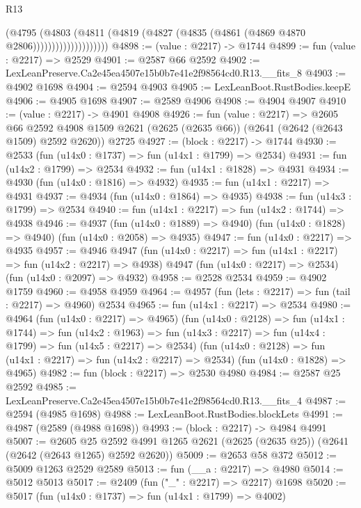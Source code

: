 \begin{lexlean}{R13}
\begin{coremodule}
                            (@4795
                              (@4803
                                (@4811
                                  (@4819 (@4827 (@4835 (@4861 (@4869 @4870 @2806))))))))))))))))))))
@4898 := (value : @2217) -> @1744
@4899 := fun (value : @2217) => @2529
@4901 := @2587 @66 @2592
@4902 := LexLeanPreserve.Ca2e45ea4507e15b0b7e41e2f98564cd0.R13.__fits_8
@4903 := @4902 @1698
@4904 := @2594 @4903
@4905 := LexLeanBoot.RustBodies.keepE
@4906 := @4905 @1698
@4907 := @2589 @4906
@4908 := @4904 @4907
@4910 := (value : @2217) -> @4901 @4908
@4926 := fun (value : @2217) =>
  @2605
    @66
    @2592
    @4908
    @1509
    @2621
    (@2625 (@2635 @66))
    (@2641 (@2642 (@2643 @1509) @2592 @2620))
    @2725
@4927 := (block : @2217) -> @1744
@4930 := @2533 (fun (u14x0 : @1737) => fun (u14x1 : @1799) => @2534)
@4931 := fun (u14x2 : @1799) => @2534
@4932 := fun (u14x1 : @1828) => @4931
@4934 := @4930 (fun (u14x0 : @1816) => @4932)
@4935 := fun (u14x1 : @2217) => @4931
@4937 := @4934 (fun (u14x0 : @1864) => @4935)
@4938 := fun (u14x3 : @1799) => @2534
@4940 := fun (u14x1 : @2217) => fun (u14x2 : @1744) => @4938
@4946 := @4937
    (fun (u14x0 : @1889) => @4940)
    (fun (u14x0 : @1828) => @4940)
    (fun (u14x0 : @2058) => @4935)
@4947 := fun (u14x0 : @2217) => @4935
@4957 := @4946
    @4947
    (fun (u14x0 : @2217) => fun (u14x1 : @2217) => fun (u14x2 : @2217) => @4938)
    @4947
    (fun (u14x0 : @2217) => @2534)
    (fun (u14x0 : @2097) => @4932)
@4958 := @2528 @2534
@4959 := @4902 @1759
@4960 := @4958 @4959
@4964 := @4957 (fun (lets : @2217) => fun (tail : @2217) => @4960) @2534
@4965 := fun (u14x1 : @2217) => @2534
@4980 := @4964
    (fun (u14x0 : @2217) => @4965)
    (fun (u14x0 : @2128) =>
    fun (u14x1 : @1744) =>
    fun (u14x2 : @1963) =>
    fun (u14x3 : @2217) => fun (u14x4 : @1799) => fun (u14x5 : @2217) => @2534)
    (fun (u14x0 : @2128) => fun (u14x1 : @2217) => fun (u14x2 : @2217) => @2534)
    (fun (u14x0 : @1828) => @4965)
@4982 := fun (block : @2217) => @2530 @4980
@4984 := @2587 @25 @2592
@4985 := LexLeanPreserve.Ca2e45ea4507e15b0b7e41e2f98564cd0.R13.__fits_4
@4987 := @2594 (@4985 @1698)
@4988 := LexLeanBoot.RustBodies.blockLets
@4991 := @4987 (@2589 (@4988 @1698))
@4993 := (block : @2217) -> @4984 @4991
@5007 := @2605
    @25
    @2592
    @4991
    @1265
    @2621
    (@2625 (@2635 @25))
    (@2641 (@2642 (@2643 @1265) @2592 @2620))
@5009 := @2653 @58 @372
@5012 := @5009 @1263 @2529 @2589
@5013 := fun (__a : @2217) => @4980
@5014 := @5012 @5013
@5017 := @2409 (fun ("_" : @2217) => @2217) @1698
@5020 := @5017 (fun (u14x0 : @1737) => fun (u14x1 : @1799) => @4002)

\end{coremodule}
\end{lexlean}
